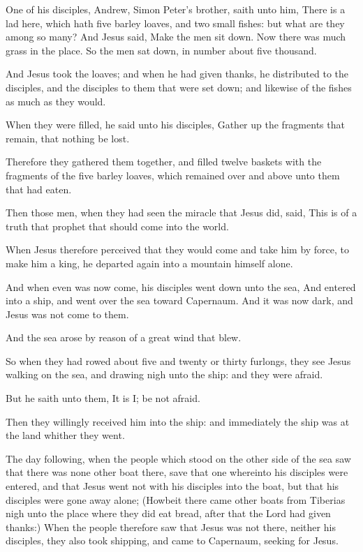 \Verse One of his disciples, Andrew, Simon Peter's brother, saith unto him, \Verse There is a lad here, which hath five barley loaves, and two small fishes: but what are they among so many?  \Verse And Jesus said, Make the men sit down. Now there was much grass in the place. So the men sat down, in number about five thousand.

\Verse And Jesus took the loaves; and when he had given thanks, he distributed to the disciples, and the disciples to them that were set down; and likewise of the fishes as much as they would.

\Verse When they were filled, he said unto his disciples, Gather up the fragments that remain, that nothing be lost.

\Verse Therefore they gathered them together, and filled twelve baskets with the fragments of the five barley loaves, which remained over and above unto them that had eaten.

\Verse Then those men, when they had seen the miracle that Jesus did, said, This is of a truth that prophet that should come into the world.

\Verse When Jesus therefore perceived that they would come and take him by force, to make him a king, he departed again into a mountain himself alone.

\Verse And when even was now come, his disciples went down unto the sea, \Verse And entered into a ship, and went over the sea toward Capernaum.  And it was now dark, and Jesus was not come to them.

\Verse And the sea arose by reason of a great wind that blew.

\Verse So when they had rowed about five and twenty or thirty furlongs, they see Jesus walking on the sea, and drawing nigh unto the ship: and they were afraid.

\Verse But he saith unto them, It is I; be not afraid.

\Verse Then they willingly received him into the ship: and immediately the ship was at the land whither they went.

\Verse The day following, when the people which stood on the other side of the sea saw that there was none other boat there, save that one whereinto his disciples were entered, and that Jesus went not with his disciples into the boat, but that his disciples were gone away alone; \Verse (Howbeit there came other boats from Tiberias nigh unto the place where they did eat bread, after that the Lord had given thanks:) \Verse When the people therefore saw that Jesus was not there, neither his disciples, they also took shipping, and came to Capernaum, seeking for Jesus.

